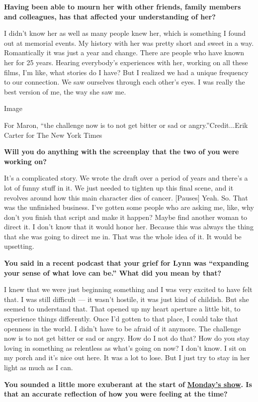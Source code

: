 \textbf{Having been able to mourn her with other friends, family members
and colleagues, has that affected your understanding of her?}

I didn't know her as well as many people knew her, which is something I
found out at memorial events. My history with her was pretty short and
sweet in a way. Romantically it was just a year and change. There are
people who have known her for 25 years. Hearing everybody's experiences
with her, working on all these films, I'm like, what stories do I have?
But I realized we had a unique frequency to our connection. We saw
ourselves through each other's eyes. I was really the best version of
me, the way she saw me.

Image

For Maron, ``the challenge now is to not get bitter or sad or
angry.''Credit...Erik Carter for The New York Times

\textbf{Will you do anything with the screenplay that the two of you
were working on?}

It's a complicated story. We wrote the draft over a period of years and
there's a lot of funny stuff in it. We just needed to tighten up this
final scene, and it revolves around how this main character dies of
cancer. {[}Pauses{]} Yeah. So. That was the unfinished business. I've
gotten some people who are asking me, like, why don't you finish that
script and make it happen? Maybe find another woman to direct it. I
don't know that it would honor her. Because this was always the thing
that she was going to direct me in. That was the whole idea of it. It
would be upsetting.

\textbf{You said in a recent podcast that your grief for Lynn was
``expanding your sense of what love can be.'' What did you mean by
that?}

I knew that we were just beginning something and I was very excited to
have felt that. I was still difficult --- it wasn't hostile, it was just
kind of childish. But she seemed to understand that. That opened up my
heart aperture a little bit, to experience things differently. Once I'd
gotten to that place, I could take that openness in the world. I didn't
have to be afraid of it anymore. The challenge now is to not get bitter
or sad or angry. How do I not do that? How do you stay loving in
something as relentless as what's going on now? I don't know. I sit on
my porch and it's nice out here. It was a lot to lose. But I just try to
stay in her light as much as I can.

\textbf{You sounded a little more exuberant at the start of}
\textbf{\href{http://www.wtfpod.com/podcast/episode-1143-seth-rogen}{Monday's
show}. Is that an accurate reflection of how you were feeling at the
time?}

